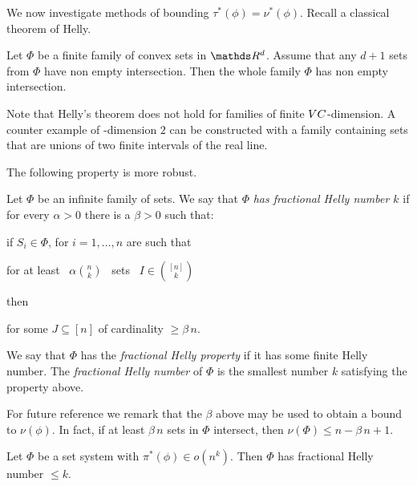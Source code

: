 \documentclass[sputnik.tex]{subfiles}
\begin{document}
We now investigate methods of bounding $\tau^*(\phi)=\nu^*(\phi)$.
Recall a classical theorem of Helly.

\begin{proposition}
Let $\Phi$ be a finite family of convex sets in $\RR^d$.
Assume that any $d+1$ sets from $\Phi$ have non empty intersection.
Then the whole family $\Phi$ has non empty intersection.
\end{proposition}

Note that Helly's theorem does not hold for families of finite ${\footnotesize VC}$-dimension.
A counter example of \vc-dimension $2$ can be constructed with a family containing sets that are unions of two finite intervals of the real line.

The following property is more robust.

\begin{definition}
Let $\Phi$ be an infinite family of sets.
We say that $\Phi$ \emph{has fractional Helly number $k$\/} if for every $\alpha>0$ there is a $\beta>0$ such that:

if $S_i\in\Phi$, for $i=1,\dots,n$ are such that

\hfill for at least \ $\displaystyle\alpha{n\choose k}$ \ sets \ $\displaystyle I\in{[n]\choose k}$

then

\hfill for some $J\subseteq [n]$ of cardinality $\ge\beta\,n$.

We say that $\Phi$ has the \emph{fractional Helly property\/} if it has some finite Helly number.
The \emph{fractional Helly number\/} of $\Phi$ is the smallest number $k$ satisfying the property above.
\QED
\end{definition}

For future reference we remark that the $\beta$ above may be used to obtain a bound to $\nu(\phi)$. In fact, if at least $\beta\,n$ sets in $\Phi$ intersect, then $\nu(\Phi)\le n-\beta\,n+1$.  

\begin{theorem}
Let $\Phi$ be a set system with $\pi^*(\phi)\in o(n^k)$.
Then $\Phi$ has fractional Helly number $\le k$.
\end{theorem}
\end{document}
